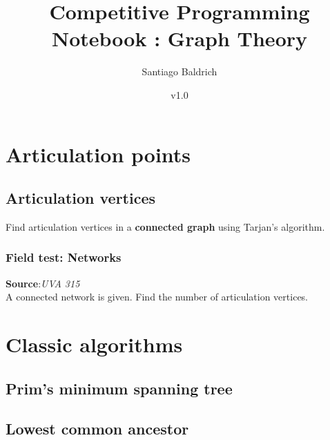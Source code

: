 \documentclass[11pt, oneside]{article}   	%
\title{Competitive Programming Notebook : Graph Theory}
\author{Santiago Baldrich}
\date{v1.0}
\begin{document}
\tableofcontents
\newpage


\section{Articulation points}
\subsection{Articulation vertices}
Find articulation vertices in a \textbf{connected graph} using Tarjan's algorithm. 

\subsubsection{Field test: Networks }
\textbf{Source}:\textit{UVA 315}\\
A connected network is given. Find the number of articulation vertices.

\section{Classic algorithms}
\subsection{Prim's minimum spanning tree}
\subsection{Lowest common ancestor}
\end{document}
